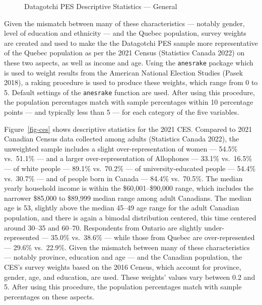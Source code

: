 \documentclass[
  letterpaper,
  DIV=11,
  numbers=noendperiod]{scrreprt}
\begin{document}
\begin{figure}


\caption{\label{fig-dg}Datagotchi PES Descriptive Statistics ---
General}

\end{figure}%

Given the mismatch between many of these characteristics --- notably
gender, level of education and ethnicity --- and the Quebec population,
survey weights are created and used to make the the Datagotchi PES
sample more representative of the Quebec population as per the 2021
Census (Statistics Canada 2022) on these two aspects, as well as income
and age. Using the \texttt{anesrake} package which is used to weight
results from the American National Election Studies (Pasek 2018), a
raking procedure is used to produce these weights, which range from 0 to
5. Default settings of the \texttt{anesrake} function are used. After
using this procedure, the population percentages match with sample
percentages within 10 percentage points --- and typically less than 5
--- for each category of the five variables.

Figure~\ref{fig-ces} shows descriptive statistics for the 2021 CES.
Compared to 2021 Canadian Census data collected among adults (Statistics
Canada 2022), the unweighted sample includes a slight
over-representation of women --- 54.5\% vs.~51.1\% --- and a larger
over-representation of Allophones --- 33.1\% vs.~16.5\% --- of white
people --- 89.1\% vs.~70.2\% --- of university-educated people ---
54.4\% vs.~30.7\% --- and of people born in Canada --- 84.4\%
vs.~70.5\%. The median yearly household income is within the
\$60,001--\$90,000 range, which includes the narrower \$85,000 to
\$89,999 median range among adult Canadians. The median age is 53,
slightly above the median 45--49 age range for the adult Canadian
population, and there is again a bimodal distribution centered, this
time centered around 30--35 and 60--70. Respondents from Ontario are
slightly under-represented --- 35.0\% vs.~38.6\% --- while those from
Quebec are over-represented --- 29.6\% vs.~22.9\%. Given the mismatch
between many of these characteristics --- notably province, education
and age --- and the Canadian population, the CES's survey weights based
on the 2016 Census, which account for province, gender, age, and
education, are used. These weights' values vary between 0.2 and 5. After
using this procedure, the population percentages match with sample
percentages on these aspects.
\end{document}
